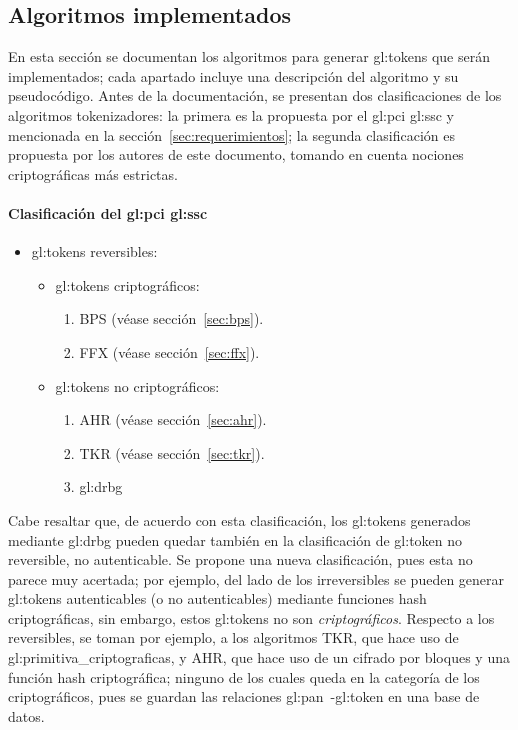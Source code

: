 %
%

\subsection{Algoritmos implementados}
\label{sec:algoritmos}

En esta sección se documentan los algoritmos para generar \glspl{gl:token}
que serán implementados; cada apartado incluye una descripción del
algoritmo y su pseudocódigo. Antes de la documentación, se presentan
dos clasificaciones de los algoritmos tokenizadores: la primera es la propuesta
por el \gls{gl:pci} \gls{gl:ssc} y mencionada en la
sección~\ref{sec:requerimientos}; la segunda clasificación es propuesta por los
autores de este documento, tomando en cuenta nociones criptográficas más
estrictas.


\paragraph{Clasificación del \texorpdfstring{\acrlong{gl:pci}}{PCI} \texorpdfstring{\acrlong{gl:ssc}}{SSC}}
\begin{itemize}
  \item \Glspl{gl:token} reversibles:
    \begin{itemize}
      \item \Glspl{gl:token} criptográficos:
        \begin{enumerate}
          \item BPS (véase sección~\ref{sec:bps}).
          \item FFX (véase sección~\ref{sec:ffx}).
        \end{enumerate}
      \item \Glspl{gl:token} no criptográficos:
        \begin{enumerate}
          \item AHR (véase sección~\ref{sec:ahr}).
          \item TKR (véase sección~\ref{sec:tkr}).
          \item \gls{gl:drbg}
        \end{enumerate}
    \end{itemize}
\end{itemize}

Cabe resaltar que, de acuerdo con esta clasificación, los \glspl{gl:token}
generados mediante \gls{gl:drbg} pueden quedar también en la clasificación
de \gls{gl:token} no reversible, no autenticable. Se propone una nueva
clasificación, pues esta no parece muy acertada; por ejemplo, del lado de los
irreversibles se pueden generar \glspl{gl:token} autenticables (o no
autenticables) mediante funciones hash criptográficas, sin embargo, estos
\glspl{gl:token} no son \textit{criptográficos}. Respecto a los reversibles,
se toman por ejemplo, a los algoritmos TKR, que hace uso de
\glspl{gl:primitiva_criptografica}, y AHR, que hace uso de un cifrado
por bloques y una función hash criptográfica; ninguno de los cuales queda en
la categoría de los criptográficos, pues se guardan las relaciones
\gls{gl:pan}~-\gls{gl:token} en una base de datos.


